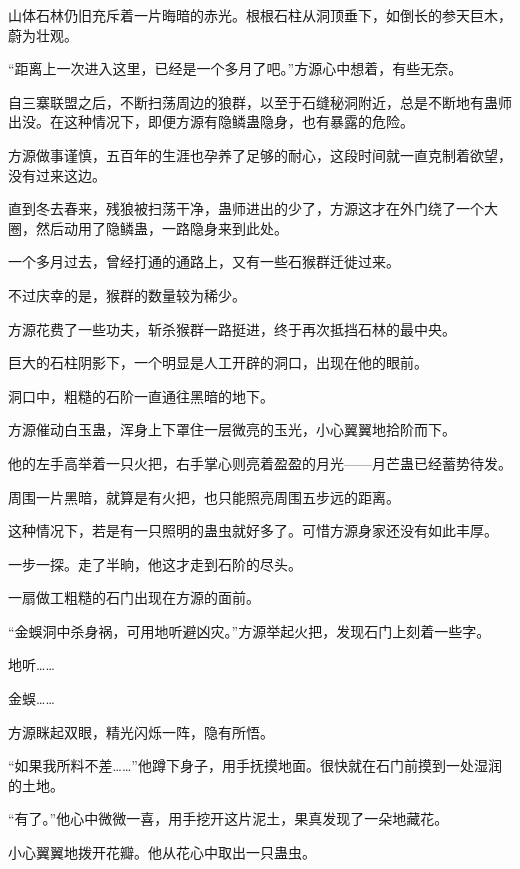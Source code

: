 
\begin{this_body}

山体石林仍旧充斥着一片晦暗的赤光。根根石柱从洞顶垂下，如倒长的参天巨木，蔚为壮观。

“距离上一次进入这里，已经是一个多月了吧。”方源心中想着，有些无奈。

自三寨联盟之后，不断扫荡周边的狼群，以至于石缝秘洞附近，总是不断地有蛊师出没。在这种情况下，即便方源有隐鳞蛊隐身，也有暴露的危险。

方源做事谨慎，五百年的生涯也孕养了足够的耐心，这段时间就一直克制着欲望，没有过来这边。

直到冬去春来，残狼被扫荡干净，蛊师进出的少了，方源这才在外门绕了一个大圈，然后动用了隐鳞蛊，一路隐身来到此处。

一个多月过去，曾经打通的通路上，又有一些石猴群迁徙过来。

不过庆幸的是，猴群的数量较为稀少。

方源花费了一些功夫，斩杀猴群一路挺进，终于再次抵挡石林的最中央。

巨大的石柱阴影下，一个明显是人工开辟的洞口，出现在他的眼前。

洞口中，粗糙的石阶一直通往黑暗的地下。

方源催动白玉蛊，浑身上下罩住一层微亮的玉光，小心翼翼地拾阶而下。

他的左手高举着一只火把，右手掌心则亮着盈盈的月光——月芒蛊已经蓄势待发。

周围一片黑暗，就算是有火把，也只能照亮周围五步远的距离。

这种情况下，若是有一只照明的蛊虫就好多了。可惜方源身家还没有如此丰厚。

一步一探。走了半晌，他这才走到石阶的尽头。

一扇做工粗糙的石门出现在方源的面前。

“金蜈洞中杀身祸，可用地听避凶灾。”方源举起火把，发现石门上刻着一些字。

地听……

金蜈……

方源眯起双眼，精光闪烁一阵，隐有所悟。

“如果我所料不差……”他蹲下身子，用手抚摸地面。很快就在石门前摸到一处湿润的土地。

“有了。”他心中微微一喜，用手挖开这片泥土，果真发现了一朵地藏花。

小心翼翼地拨开花瓣。他从花心中取出一只蛊虫。


\end{this_body}
